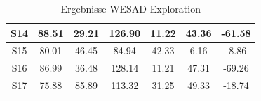 \begin{table}[hp]
\begin{tabular}{ccccccc}
    \multicolumn{1}{|c|}{S14}                                                         & \multicolumn{1}{c|}{88.51}                                      & \multicolumn{1}{c|}{29.21}                                   & \multicolumn{1}{c|}{126.90}                                   & \multicolumn{1}{c|}{11.22}                                    & \multicolumn{1}{c|}{43.36}                                    & \multicolumn{1}{c|}{-61.58}                                    \\ \hline
    \multicolumn{1}{|c|}{S15}                                                         & \multicolumn{1}{c|}{80.01}                                      & \multicolumn{1}{c|}{46.45}                                   & \multicolumn{1}{c|}{84.94}                                    & \multicolumn{1}{c|}{42.33}                                    & \multicolumn{1}{c|}{6.16}                                     & \multicolumn{1}{c|}{-8.86}                                     \\ \hline
    \multicolumn{1}{|c|}{S16}                                                         & \multicolumn{1}{c|}{86.99}                                      & \multicolumn{1}{c|}{36.48}                                   & \multicolumn{1}{c|}{128.14}                                   & \multicolumn{1}{c|}{11.21}                                    & \multicolumn{1}{c|}{47.31}                                    & \multicolumn{1}{c|}{-69.26}                                    \\ \hline
    \multicolumn{1}{|c|}{S17}                                                         & \multicolumn{1}{c|}{75.88}                                      & \multicolumn{1}{c|}{85.89}                                   & \multicolumn{1}{c|}{113.32}                                   & \multicolumn{1}{c|}{31.25}                                    & \multicolumn{1}{c|}{49.33}                                    & \multicolumn{1}{c|}{-18.74}                                    \\ \hline
\end{tabular}
\caption{Ergebnisse WESAD-Exploration}
\label{tab:wesad_werte}
\end{table}

